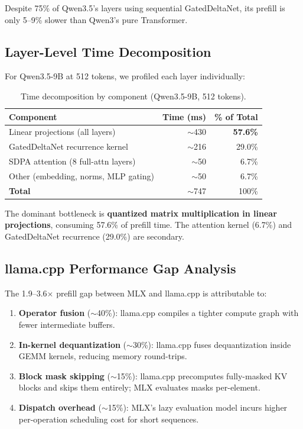 \documentclass[11pt,a4paper]{article}
\begin{document}
Despite 75\% of Qwen3.5's layers using sequential GatedDeltaNet, its prefill is only 5--9\% slower than Qwen3's pure Transformer.

\subsection{Layer-Level Time Decomposition}

For Qwen3.5-9B at 512 tokens, we profiled each layer individually:

\begin{table}[H]
\centering
\caption{Time decomposition by component (Qwen3.5-9B, 512 tokens).}
\label{tab:decomposition}
\begin{tabular}{lrr}
\toprule
\textbf{Component} & \textbf{Time (ms)} & \textbf{\% of Total} \\
\midrule
Linear projections (all layers) & $\sim$430 & \textbf{57.6\%} \\
GatedDeltaNet recurrence kernel & $\sim$216 & 29.0\% \\
SDPA attention (8 full-attn layers) & $\sim$50 & 6.7\% \\
Other (embedding, norms, MLP gating) & $\sim$50 & 6.7\% \\
\midrule
\textbf{Total} & $\sim$747 & 100\% \\
\bottomrule
\end{tabular}
\end{table}

The dominant bottleneck is \textbf{quantized matrix multiplication in linear projections}, consuming 57.6\% of prefill time. The attention kernel (6.7\%) and GatedDeltaNet recurrence (29.0\%) are secondary.

\subsection{llama.cpp Performance Gap Analysis}

The 1.9--3.6$\times$ prefill gap between MLX and llama.cpp is attributable to:

\begin{enumerate}[leftmargin=2em]
  \item \textbf{Operator fusion} ($\sim$40\%): llama.cpp compiles a tighter compute graph with fewer intermediate buffers.
  \item \textbf{In-kernel dequantization} ($\sim$30\%): llama.cpp fuses dequantization inside GEMM kernels, reducing memory round-trips.
  \item \textbf{Block mask skipping} ($\sim$15\%): llama.cpp precomputes fully-masked KV blocks and skips them entirely; MLX evaluates masks per-element.
  \item \textbf{Dispatch overhead} ($\sim$15\%): MLX's lazy evaluation model incurs higher per-operation scheduling cost for short sequences.
\end{enumerate}
\end{document}
